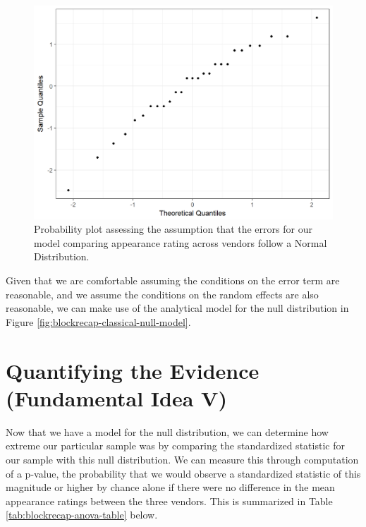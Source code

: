 \documentclass[]{book}
\theoremstyle{plain}
\theoremstyle{mydefn}
\theoremstyle{myexmpl}
\theoremstyle{remark}
\begin{document}
\begin{figure}

{\centering \includegraphics[width=0.8\linewidth]{./Images/blockrecap-resids-probplot-1} 

}

\caption{Probability plot assessing the assumption that the errors for our model comparing appearance rating across vendors follow a Normal Distribution.}\label{fig:blockrecap-resids-probplot}
\end{figure}

Given that we are comfortable assuming the conditions on the error term
are reasonable, and we assume the conditions on the random effects are
also reasonable, we can make use of the analytical model for the null
distribution in Figure \ref{fig:blockrecap-classical-null-model}.

\section{Quantifying the Evidence (Fundamental Idea
V)}\label{quantifying-the-evidence-fundamental-idea-v-2}

Now that we have a model for the null distribution, we can determine how
extreme our particular sample was by comparing the standardized
statistic for our sample with this null distribution. We can measure
this through computation of a p-value, the probability that we would
observe a standardized statistic of this magnitude or higher by chance
alone if there were no difference in the mean appearance ratings between
the three vendors. This is summarized in Table
\ref{tab:blockrecap-anova-table} below.
\end{document}
